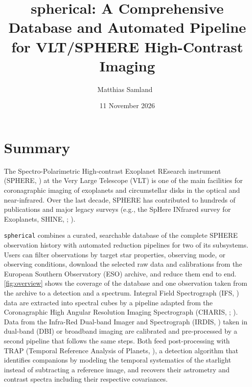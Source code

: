\documentclass[
]{article}
\title{spherical: A Comprehensive Database and Automated Pipeline for
VLT/SPHERE High-Contrast Imaging}
\author[1%
  ]{Matthias Samland%
    \,\orcidlink{0000-0001-9992-4067}\,%
    }
\affil[1]{Max-Planck-Institut für Astronomie (MPIA), Königstuhl 17,
69117 Heidelberg, Germany%
  }
\date{11 November 2026}
\begin{document}
\maketitle

\section{Summary}\label{summary}

The Spectro-Polarimetric High-contrast Exoplanet REsearch instrument
(SPHERE, ) at the Very
Large Telescope (VLT) is one of the main facilities for coronagraphic
imaging of exoplanets and circumstellar disks in the optical and
near-infrared. Over the last decade, SPHERE has contributed to hundreds
of publications and major legacy surveys (e.g., the SpHere INfrared
survey for Exoplanets, SHINE, ; ).

\texttt{spherical} combines a curated, searchable database of the
complete SPHERE observation history with automated reduction pipelines
for two of its subsystems. Users can filter observations by target star
properties, observing mode, or observing conditions, download the
selected raw data and calibrations from the European Southern
Observatory (ESO) archive, and reduce them end to end.
\autoref{fig:overview} shows the coverage of the database and one
observation taken from the archive to a detection and a spectrum.
Integral Field Spectrograph (IFS, ) data are extracted into spectral cubes by a pipeline adapted
from the Coronagraphic High Angular Resolution Imaging Spectrograph
(CHARIS, ;
). Data from the
Infra-Red Dual-band Imager and Spectrograph (IRDIS,
) taken in dual-band
(DBI) or broadband imaging are calibrated and pre-processed by a second
pipeline that follows the same steps. Both feed post-processing with
TRAP (Temporal Reference Analysis of Planets,
), a detection
algorithm that identifies companions by modeling the temporal
systematics of the starlight instead of subtracting a reference image,
and recovers their astrometry and contrast spectra including their
respective covariances.
\end{document}
